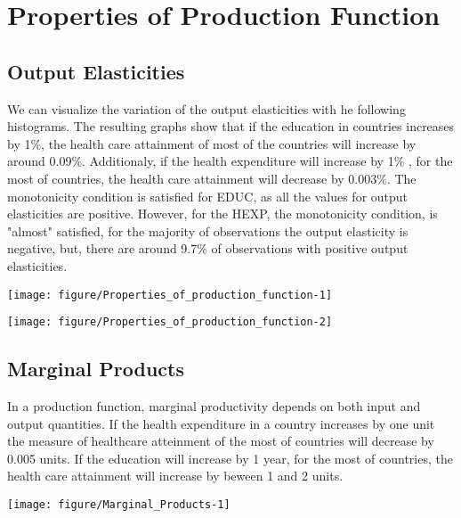 \documentclass[12pt,a4paper]{article}\usepackage[]{graphicx}\usepackage[]{color}
\makeatletter
\def\maxwidth{ %
  \ifdim\Gin@nat@width>\linewidth
    \linewidth
  \else
    \Gin@nat@width
  \fi
}
\makeatother
\begin{document}

\section{Properties of Production Function}

\subsection{Output Elasticities}

We can visualize the variation of the output elasticities with he following histograms. The resulting graphs show that if the education in countries increases 
 by 1\%, the health care attainment of most of the countries 
will increase by around 0.09\%. Additionaly, if the health expenditure will increase by 1\% , for the most of  
countries, the health care attainment will decrease by 0.003\%.
The monotonicity condition is satisfied for EDUC, as all the values for output elasticities
are positive.
However, for the HEXP, the monotonicity condition, is "almost" satisfied, 
for the majority of observations the output elasticity is negative, but, there are
around 9.7\% of observations with positive output elasticities. 

\texttt{[image: figure/Properties\_of\_production\_function-1]} 

\texttt{[image: figure/Properties\_of\_production\_function-2]} 

\subsection{Marginal Products}
In a production function, marginal productivity depends on both input and output 
quantities.
If the health expenditure in a country increases  by one unit 
the measure of healthcare atteinment of the most of countries 
will decrease by 0.005 units.
If the education will increase by 1 year, for the most of  countries, the 
health care attainment will increase by beween 1 and 2 units.


\texttt{[image: figure/Marginal\_Products-1]} 
\end{document}
